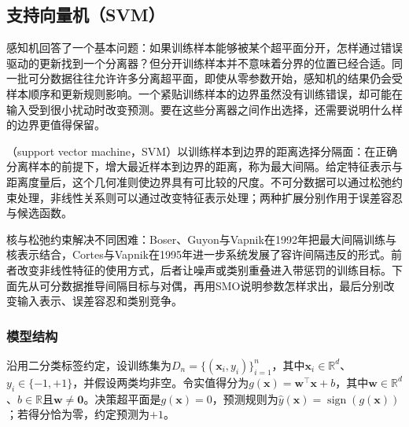 \subsection{支持向量机（SVM）}
\label{sec:classification-svm}

感知机回答了一个基本问题：如果训练样本能够被某个超平面分开，怎样通过错误驱动的更新找到一个分离器？但分开训练样本并不意味着分界的位置已经合适。同一批可分数据往往允许许多分离超平面，即使从零参数开始，感知机的结果仍会受样本顺序和更新规则影响。一个紧贴训练样本的边界虽然没有训练错误，却可能在输入受到很小扰动时改变预测。要在这些分离器之间作出选择，还需要说明什么样的边界更值得保留。

（support vector machine，SVM）以训练样本到边界的距离选择分隔面：在正确分离样本的前提下，增大最近样本到边界的距离，称为最大间隔。给定特征表示与距离度量后，这个几何准则使边界具有可比较的尺度。不可分数据可以通过松弛约束处理，非线性关系则可以通过改变特征表示处理；两种扩展分别作用于误差容忍与候选函数。

核与松弛约束解决不同困难：Boser、Guyon与Vapnik在1992年把最大间隔训练与核表示结合，Cortes与Vapnik在1995年进一步系统发展了容许间隔违反的形式。前者改变非线性特征的使用方式，后者让噪声或类别重叠进入带惩罚的训练目标。下面先从可分数据推导间隔目标与对偶，再用SMO说明参数怎样求出，最后分别改变输入表示、误差容忍和类别竞争。

\subsubsection{模型结构}
\label{sec:classification-svm-model}

沿用二分类标签约定，设训练集为$D_n=\{(\bm{x}_i,y_i)\}_{i=1}^n$，其中$\bm{x}_i\in\mathbb{R}^d$、$y_i\in\{-1,+1\}$，并假设两类均非空。令实值得分为$g(\bm{x})=\bm{w}^{\top}\bm{x}+b$，其中$\bm{w}\in\mathbb{R}^d$、$b\in\mathbb{R}$且$\bm{w}\ne\bm{0}$。决策超平面是$g(\bm{x})=0$，预测规则为$\hat y(\bm{x})=\operatorname{sign}(g(\bm{x}))$；若得分恰为零，约定预测为$+1$。

